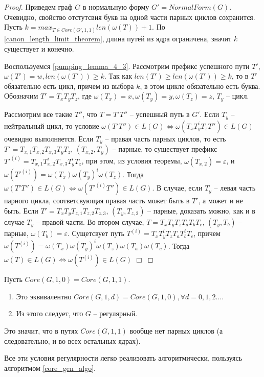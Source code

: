 \begin{proof}
    Приведем граф $G$ в нормальную форму $G' = NormalForm(G)$. 
    Очевидно, свойство отстутсвия букв на одной части парных циклов сохранится.
    Пусть $k = max_{T \in Core(G',1,1)} len(\omega(T)) + 1$. 
    По \ref{canon_length_limit_theorem}, длина путей из ядра ограничена, значит $k$ существует и конечно.

    Воспользуемся \ref{pumping_lemma_4_3}.
    Рассмотрим префикс успешного пути $T'$, $\omega(T') = w, len(\omega(T')) \geq k$. 
    Так как $len(T') \geq len(\omega(T')) \geq k$, то в $T'$ обязательно есть цикл, 
    причем из выбора $k$, в этом цикле обязательно есть буква.
    Обозначим $T' = T_x T_y T_z$, где $\omega(T_x) = x, \omega(T_y) = y, \omega(T_z) = z$, $T_y$ -- цикл.
    
    Рассмотрим все такие $T''$, что $T = T' T''$ -- успешный путь в $G'$.
    Если $T_y$ -- нейтральный цикл, то условие $\omega(T' T'') \in L(G) \iff \omega(T_x T_y^i T_z T'') \in L(G)$ очевидно выполняется.
    Если $T_y$ -- правая часть парных циклов, то есть $T' = T_{x,1} T_{x,2} T_{x,3} T_y T_z$, $(T_{x,2}, T_y)$ -- парные,
    то существует префикс $T'^{(i)} = T_{x,1} T_{x,2}^i T_{x,3} T_y^i T_z$, при этом, из условия теоремы, $\omega(T_{x,2}) = \varepsilon$,
    и $\omega(T'^{(i)}) = \omega(T_x) \omega(T_y)^i \omega(T_z)$. Тогда $\omega(T' T'') \in L(G) \iff \omega(T'^{(i)} T'') \in L(G)$.
    В случае, если $T_y$ -- левая часть парного цикла, соответсвующая правая часть может быть в $T'$, а может и не быть. 
    Если $T' = T_x T_y T_{z,1} T_{z,2} T_{z,3}$, $(T_y,T_{z,2})$ -- парные, доказать можно, как и в случае $T_y$ -- правой части.
    Во втором случае, $T = T_x T_y T_z T_a T_b T_c$, $(T_y,T_b)$ -- парные,
    $\omega(T_b) = \varepsilon$. Сущетсвует путь $T^{(i)} = T_x T_y^i T_z T_a T_b^i T_c$, 
    причем $\omega(T^{(i)}) = \omega(T_x) \omega(T_y)^i \omega(T_z) \omega(T_a) \omega(T_c)$. Тогда $\omega(T) \in L(G) \iff \omega(T^{(i)}) \in L(G)$ $\Box$

\end{proof}

\begin{corollary}
    \label{codition_only_neutral}
    Пусть $Core(G, 1, 0) = Core(G, 1, 1)$.
    \begin{enumerate}[label=\arabic*)]
        \item Это эквивалентно $Core(G, 1, d) = Core(G, 1, 0), \forall d = 0,1,2 \dots$.
        \item Из этого следует, что $G$ -- регулярный.
    \end{enumerate}
\end{corollary}
Это значит, что в путях $Core(G, 1, 1)$ вообще нет парных циклов (а следовательно, и во всех остальных ядрах).


Все эти условия регулярности легко реализовать алгоритмически, пользуясь алгоритмом \ref{core_gen_algo}.

\clearpage